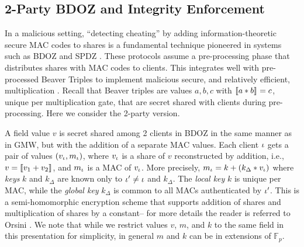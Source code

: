 \subsection{2-Party BDOZ and Integrity Enforcement}
\label{section-example-bdoz}



In a malicious setting, ``detecting cheating'' by adding
information-theoretic secure MAC codes to shares is a fundamental
technique pioneered in systems such as BDOZ and SPDZ
\cite{SPDZ1,SPDZ2,BDOZ,10.1007/978-3-030-68869-1_3}.  These protocols
assume a pre-processing phase that distributes shares with MAC codes
to clients.  This integrates well with pre-processed Beaver Triples to
implement malicious secure, and relatively efficient, multiplication
\cite{evans2018pragmatic}. Recall that Beaver triples are values $a,b,c$ with
$\llbracket a * b \rrbracket_{} = c$, unique per multiplication gate, that are secret
shared with clients during pre-processing. Here we consider the
2-party version.

A field value $v$ is secret shared among 2 clients in BDOZ in the same
manner as in GMW, but with the addition of a separate MAC values.  Each
client $\iota$ gets a pair of values $(v_\iota,m_\iota)$, where $v_\iota$
is a share of $v$ reconstructed by addition, i.e., $v = \llbracket v_1
  + v_2 \rrbracket_{}$, and $m_\iota$ is a MAC of $v_\iota$.  More precisely,
$m_\iota = k + (k_\Delta * v_\iota)$ where \emph{keys} $k$ and
$k_\Delta$ are known only to $\iota' \ne \iota$ and $k_\Delta$. The
\emph{local key} $k$ is unique per MAC, while the \emph{global key}
$k_\Delta$ is common to all MACs authenticated by $\iota'$. This is a
semi-homomorphic encryption scheme that supports addition of shares
and multiplication of shares by a constant-- for more details the
reader is referred to Orsini \cite{10.1007/978-3-030-68869-1_3}. We
note that while we restrict values $v$, $m$, and $k$ to the same field
in this presentation for simplicity, in general $m$ and $k$ can be in
extensions of $\mathbb{F}_p$.

